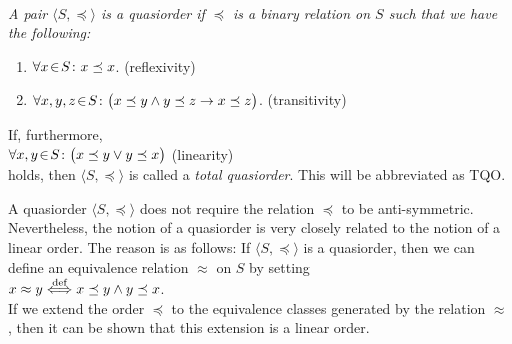 \begin{Definition}[Quasiorder]  \hspace*{\fill} \\
{\em
  A pair $\langle S, \preceq\rangle$ is a \emph{quasiorder}  if $\preceq$ is a 
  binary relation on $S$ such that we have the following:
  \begin{enumerate}
  \item $\forall x \!\in\! S\colon x \preceq x$. \hspace*{\fill} (reflexivity)
  \item $\forall x, y, z \!\in\! S \colon \bigl(x \preceq y \wedge y \preceq z \rightarrow x \preceq z\bigr)$. 
         \hspace*{\fill} (transitivity)
  \end{enumerate}
  If, furthermore,
  \\[0.2cm]
  \hspace*{1.3cm}
  $\forall x, y \!\in\! S \colon \bigl(x \preceq y \vee y \preceq x\bigr)$ \hspace*{\fill} (linearity)
  \\[0.2cm]
  holds, then $\langle S, \preceq \rangle$ is called a \emph{total quasiorder}.  This will be
  abbreviated as \textsc{TQO}.
}
\end{Definition}
A quasiorder $\langle S, \preceq \rangle$ does not require the relation $\preceq$ to be
anti-symmetric.  Nevertheless, the notion of a quasiorder is very closely related to the notion of a
linear order.  The reason is as follows:  If $\langle S, \preceq \rangle$ is a quasiorder, then we
can define an equivalence relation $\approx$ on $S$ by setting
\\[0.2cm]
\hspace*{1.3cm}
$x \approx y \stackrel{\mbox{\scriptsize def}}{\Longleftrightarrow} x \preceq y \wedge y \preceq x$. 
\\[0.2cm]
If we extend the order $\preceq$ to the equivalence classes generated by the relation $\approx$,
then it can be shown that this extension is a linear order.
\vspace*{0.3cm}

